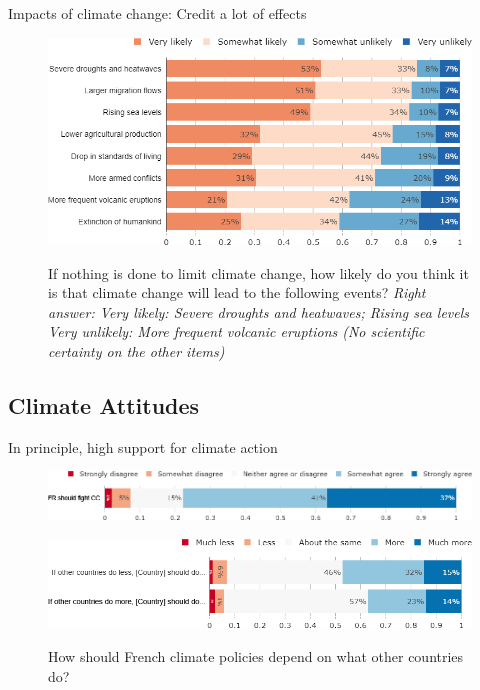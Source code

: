 \begin{framefont}{\small}
\begin{frame}{Impacts of climate change: Credit a lot of effects}%
\begin{figure}[h!]
\centering
\caption{If nothing is done to limit climate change, how likely do you think it is that climate change will lead to the following events?
\newline\footnotesize{\textit{Right answer: Very likely: Severe droughts and heatwaves; Rising sea levels \\ \quad \quad \quad \quad \quad \quad Very unlikely: More frequent volcanic eruptions (No scientific certainty on the other items)}}}
\includegraphics[width=.74\paperwidth]{../figures/FR/CC_impacts_FR.png} \\
\end{figure}
\end{frame}

\subsection{Climate Attitudes}

\begin{frame}{In principle, high support for climate action}%
\begin{figure}[h!]
\centering
\caption{Do you agree or disagree with the following statement: ``France should take measures to fight climate change."}
\includegraphics[width=.87\paperwidth]{../figures/FR/should_fight_CC_FR.png} \\
\vspace{1cm}
\caption{How should French climate policies depend on what other countries do?}
\includegraphics[width=.87\paperwidth]{../figures/FR/if_other_do_FR.png} \\
\end{figure}
\end{frame}



\end{framefont}
